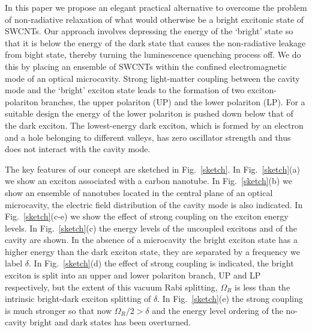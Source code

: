 \documentclass[journal=aamick,manuscript=article]{achemso}
\begin{document}

In this paper we propose an elegant practical alternative to overcome the problem of non-radiative relaxation of what would otherwise be a bright excitonic state of SWCNTs.
Our approach involves depressing the energy of the `bright' state so that it is below the energy of the dark state that causes the non-radiative leakage from bight state, thereby turning the luminescence quenching process off.
We do this by placing an ensemble of SWCNTs within the confined electromagnetic mode of an optical microcavity. Strong light-matter coupling between the cavity mode and the `bright' exciton state leads to the formation of two exciton-polariton branches, the upper polariton (UP) and the lower polariton (LP).
For a suitable design the energy of the lower polariton is pushed down below that of the dark exciton.
The lowest-energy dark exciton, which is formed by an electron and a hole belonging to different valleys, has zero oscillator strength and thus does not interact with the cavity mode.

The key features of our concept are sketched in Fig.~\ref{sketch}. In Fig.~\ref{sketch}(a) we show an exciton associated with a carbon nanotube. 
In Fig.~\ref{sketch}(b) we show an ensemble of nanotubes located in the central plane of an optical microcavity, the electric field distribution of the cavity mode is also indicated.
In Fig.~\ref{sketch}(c-e) we show the effect of strong coupling on the exciton energy levels.
In Fig.~\ref{sketch}(c) the energy levels of the uncoupled excitons and of the cavity are shown.
In the absence of a microcavity the bright exciton state has a higher energy than the dark exciton state, they are separated by a frequency we label $\delta$.
In Fig.~\ref{sketch}(d) the effect of strong coupling is indicated, the bright exciton is split into an upper and lower polariton branch, UP and LP respectively, but the extent of this vacuum Rabi splitting, $\Omega_R$ is less than the intrinsic bright-dark exciton splitting of $\delta$.
In Fig.~\ref{sketch}(e) the strong coupling is much stronger so that now $\Omega_R/2 > \delta$ and the energy level ordering of the no-cavity bright and dark states has been overturned.
\end{document}
